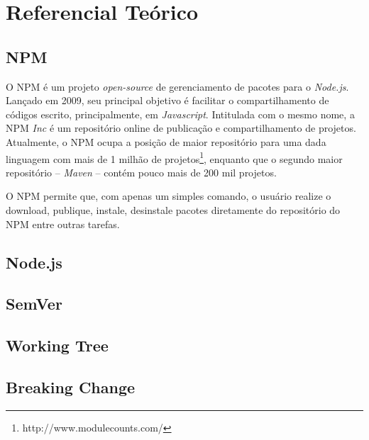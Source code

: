 \chapter{Referencial Teórico}
\label{cap:ref-teorico}

\section{\gls{NPM}}
\label{ref-teo:npm}
O \gls{NPM} é um projeto \textit{open-source} de gerenciamento de pacotes para o \textit{Node.js}. Lançado em 2009, seu principal objetivo é facilitar o compartilhamento de códigos escrito, principalmente, em \textit{Javascript}. Intitulada com o mesmo nome, a \gls{NPM} \textit{Inc} é um repositório online de publicação e compartilhamento de projetos. Atualmente, o \gls{NPM} ocupa a posição de maior repositório para uma dada linguagem com mais de 1 milhão de projetos\footnote{http://www.modulecounts.com/}, enquanto que o segundo maior repositório -- \textit{Maven} -- contém pouco mais de 200 mil  projetos.

O \gls{NPM} permite que, com apenas um simples comando, o usuário realize o download, publique, instale, desinstale pacotes diretamente do repositório do \gls{NPM} entre outras tarefas.

\section{Node.js}
\label{ref-teo:node}


\section{\gls{SemVer}}
\label{ref-teo:semver}


\section{Working Tree}
\label{ref-teo:working_tree}

\section{Breaking Change}
\label{ref-teo:breaking_change}
